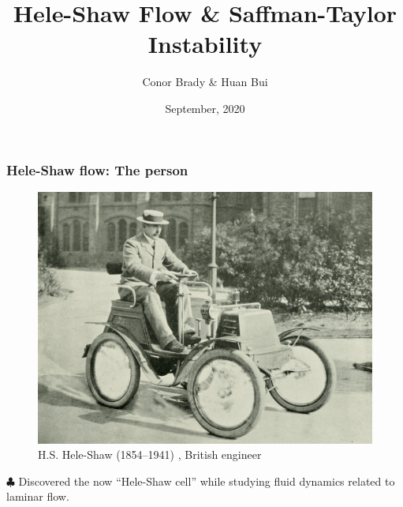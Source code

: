 \documentclass{beamer}
\title{Hele-Shaw Flow \& Saffman-Taylor Instability}
\author[Brady \& Bui] %
{Conor Brady \& Huan Bui}
\institute[Colby College] %
{
	PH333: Experimental Soft-Matter Physics
	\and
	Professor Jonathan McCoy
}
\date{September, 2020}
\begin{document}
\frame{\titlepage}



\begin{frame}
\frametitle{Hele-Shaw flow: The person}

\begin{figure}
    \centering
    \includegraphics[scale=0.4]{HS}
    \caption{H.S. Hele-Shaw (1854–1941) \cite{HLGuy}, British engineer}
    \label{fig:HS}
\end{figure}

$\clubsuit$ Discovered the now ``Hele-Shaw cell'' while studying fluid dynamics related to laminar flow. 

\end{frame}
\end{document}
